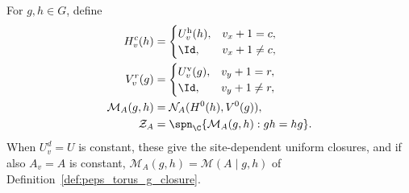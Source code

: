 \begin{definition}%
    \label{def:peps_four_cut_common_closure}
    \leanok
    For $g,h\in G$, define
    \begin{align}
        H^c_v(h)          & =\begin{cases}U^{\mathrm h}_v(h),&v_x+1=c,\\\Id,&v_x+1\ne c,\end{cases}
        \notag                                                                                      \\
        V^r_v(g)          & =\begin{cases}U^{\mathrm v}_v(g),&v_y+1=r,\\\Id,&v_y+1\ne r,\end{cases}
        \notag                                                                                      \\
        \mathcal M_A(g,h) & =\mathcal N_A(H^0(h),V^0(g)),
        \label{eq:peps_common_matched_closure}                                                      \\
        \mathcal Z_A      & =\spn_{\C}\{\mathcal M_A(g,h):gh=hg\}.
        \notag
    \end{align}
    When $U^d_v=U$ is constant, these give the site-dependent uniform closures,
    and if also $A_v=A$ is constant, $\mathcal M_A(g,h)=\mathcal M(A\mid g,h)$
    of Definition~\ref{def:peps_torus_g_closure}.
\end{definition}

